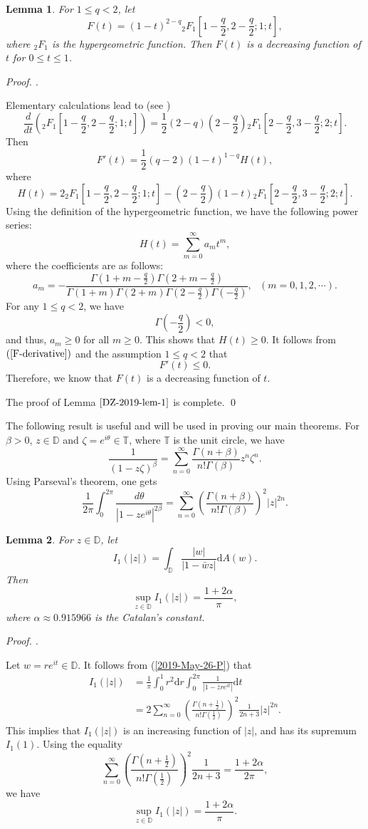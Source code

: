 \documentclass[a4paper,12pt]{amsart}
\newtheorem{lem}{Lemma}[section]
\theoremstyle{definition}
\numberwithin{equation}{section}
\newenvironment{pf}[1][]{%
 \vskip 3mm
 \noindent
 \ifthenelse{\equal{#1}{}}%
  {{\slshape Proof. }}%
  {{\slshape #1.} }%
 }%
{\qed\bigskip}
\newcommand{\ID}{{\mathbb D}}
\def\be{\begin{equation}}
\def\ee{\end{equation}}
\newcommand{\bpf}{\begin{pf}}
\newcommand{\epf}{\end{pf}}
\begin{document}
\begin{lem}\label{DZ-2019-lem-1}
For $1\leq q<2$, let
$$F(t)=\left(1-t\right)^{2-q} {}_2F_1\left[1-\frac{q}{2}, 2-\frac{q}{2}; 1; t\right],$$
where ${}_2F_1$ is the hypergeometric function.
Then $F(t)$ is a decreasing function of $t$ for $0\leq t\leq1$.
\end{lem}
\bpf
Elementary calculations lead to (see \cite{Landrews})
$$\frac{d}{dt}\left({}_2F_1\left[1-\frac{q}{2}, 2-\frac{q}{2}; 1; t\right]\right)=\frac{1}{2}(2-q)\left(2-\frac{q}{2}\right){}_2F_1\left[2-\frac{q}{2}, 3-\frac{q}{2}; 2; t\right].$$
Then
\be\label{F-derivative}F'(t)=\frac{1}{2}(q-2)(1-t)^{1-q}H(t),\ee
where
$$H(t)=2{}_2F_1\left[1-\frac{q}{2}, 2-\frac{q}{2}; 1; t\right]-\left(2-\frac{q}{2}\right)(1-t){}_2F_1\left[2-\frac{q}{2}, 3-\frac{q}{2}; 2; t\right].$$
Using the definition of the hypergeometric function, we have the following power series:
$$H(t)=\sum\limits_{m=0}^{\infty}a_mt^m,$$
where the coefficients are as follows:
$$a_m=-\frac{\Gamma(1+m-\frac{q}{2})\Gamma(2+m-\frac{q}{2})}{\Gamma(1+m)\Gamma(2+m)\Gamma(2-\frac{q}{2})\Gamma(-\frac{q}{2})}, \ \ \ (m=0, 1, 2, \cdots).$$
For any $1\leq q<2$, we have
$$\Gamma(-\frac{q}{2})<0,$$
and thus, $a_m\geq0$ for all $m\geq0$. This shows that $H(t)\geq0$.
It follows from $(\ref{F-derivative})$ and the assumption $1\leq q<2$ that
$$F'(t)\leq0.$$
Therefore, we know that $F(t)$ is a decreasing function of $t$.

The proof of Lemma $\ref{DZ-2019-lem-1}$ is complete.
\epf

The following result is useful and will be used in proving our main theorems.
For $\beta>0$, $z\in\ID$ and $\zeta=e^{i\theta}\in\mathbb{T}$, where $\mathbb{T}$ is  the unit circle, we have
$$\frac{1}{(1-z\zeta)^\beta}=\sum\limits_{n=0}^{\infty}\frac{\Gamma(n+\beta)}{n!\Gamma(\beta)}z^n\zeta^n.$$
Using Parseval's theorem, one gets
\be\label{2019-May-26-P}\frac{1}{2\pi}\int_0^{2\pi}\frac{d\theta}{|1-ze^{i\theta}|^{2\beta}}=\sum\limits_{n=0}^{\infty}\left(\frac{\Gamma(n+\beta)}{n!\Gamma(\beta)}\right)^2|z|^{2n}.\ee

\begin{lem}\label{DZ-2019-lem-I1(z)}
For $z\in\ID$, let
$$I_1(|z|)=\int_{\ID}\frac{|w|}{|1-\bar{w}z|}\mathrm{d}A(w) .$$
Then
$$\sup\limits_{z\in\ID}I_1(|z|)= \frac{1+2\alpha}{\pi},$$
where $\alpha\approx 0.915966$ is the Catalan's constant.
\end{lem}
\bpf
Let $w=re^{it}\in\ID$. It follows from (\ref{2019-May-26-P}) that
\begin{align*}
I_1(|z|)&=\frac{1}{\pi}\int_0^1r^2\mathrm{d} r\int_0^{2\pi}\frac{1}{|1-\bar{z}re^{it}|}\mathrm{d} t\\ \nonumber
&=2\sum\limits_{n=0}^{\infty}\left(\frac{\Gamma(n+\frac{1}{2})}{n!\Gamma(\frac{1}{2})}\right)^2\frac{1}{2n+3}|z|^{2n}.
\end{align*}
This implies that $I_1(|z|)$ is an increasing function of $|z|$, and has its supremum $I_1(1)$.
Using the equality
$$\sum\limits_{n=0}^{\infty}\left(\frac{\Gamma(n+\frac{1}{2})}{n!\Gamma(\frac{1}{2})}\right)^2\frac{1}{2n+3}=\frac{1+2\alpha}{2\pi},$$
 we have
$$\sup\limits_{z\in\ID}I_1(|z|)= \frac{1+2\alpha}{\pi}.$$
\end{document}
